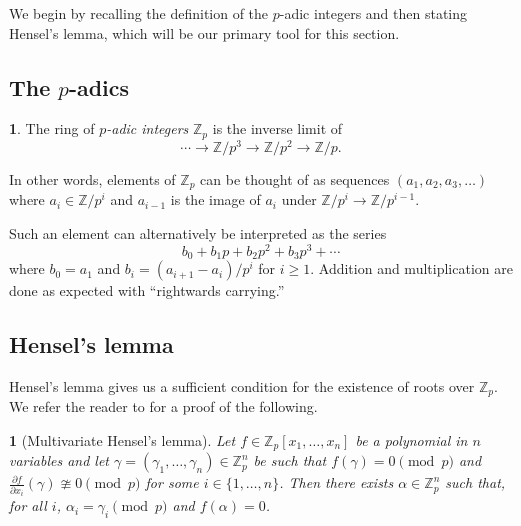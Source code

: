 \documentclass[10pt,a4paper]{amsart}
\numberwithin{equation}{section}
\numberwithin{figure}{section}
\theoremstyle{definition}
\theoremstyle{remark}
\theoremstyle{plain}
\newtheorem{thm}{\protect\theoremname}[section]
\theoremstyle{plain}
\theoremstyle{definition}
\newtheorem{defn}{\protect\definitionname}[section]
\theoremstyle{plain}
\theoremstyle{plain}
\providecommand{\definitionname}{Definition}
\providecommand{\theoremname}{Theorem}
\newcommand{\Z}{\mathbb{Z}}
\newcommand{\Q}{\mathbb{Q}}
\begin{document}
	We begin by recalling the definition of the $p$-adic integers and then stating Hensel's lemma, which will be our primary tool for this section.
	\subsection{The $p$-adics}
	\begin{defn}
		The ring of \emph{$p$-adic integers} $\Z_p$ is the inverse limit of
		\[
		\cdots \to \Z/p^3 \to \Z/p^2 \to \Z/p.
		\]
	\end{defn}
	In other words, elements of $\Z_p$ can be thought of as sequences $(a_1,a_2,a_3,\ldots)$ where $a_i \in \Z/p^i$ and $a_{i-1}$ is the image of $a_i$ under $\Z/p^i \to \Z/p^{i-1}$.
	
	Such an element can alternatively be interpreted as the series
	\[
	b_0 + b_1 p + b_2 p^2 + b_3 p^3 + \cdots
	\]
	where $b_0 = a_1$ and $b_i = (a_{i+1} - a_i)/p^i$ for $i \geq 1$. Addition and multiplication are done as expected with ``rightwards carrying.''
	
	\subsection{Hensel's lemma}\label{sec:hensels-lemma}
	Hensel's lemma gives us a sufficient condition for the existence of roots over $\Z_p$. We refer the reader to \cite{henselMO} for a proof of the following.
	\begin{thm}[Multivariate Hensel's lemma]\label{thm:hensels-one-eq}
		Let $f \in \Z_p[x_1,\ldots,x_n]$ be a polynomial in $n$ variables and let $\gamma = (\gamma_1,\ldots,\gamma_n)\in \Z_p^n$ be such that $f(\gamma) = 0 \pmod p$ and $\frac{\partial f}{\partial x_i}(\gamma) \ncong 0 \pmod p$ for some $i\in \{1,\ldots,n\}$. Then there exists $\alpha \in \Z_p^n$ such that, for all $i$, $\alpha_i = \gamma_i \pmod p$ and $f(\alpha) = 0$.
	\end{thm}
\end{document}

